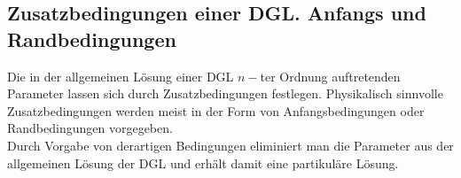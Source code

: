 \begin{enumerate}
\begin{figure}[ht]
\begin{minipage}[b]{0.45\linewidth}
\begin{center}
\end{center}

\end{minipage}
\end{figure}
\end{enumerate}
\subsection*{Zusatzbedingungen einer DGL. Anfangs und Randbedingungen}
Die in der allgemeinen Lösung einer DGL $n-$ter Ordnung auftretenden Parameter lassen sich durch Zusatzbedingungen festlegen. Physikalisch sinnvolle Zusatzbedingungen werden meist in der Form von Anfangsbedingungen oder Randbedingungen vorgegeben. \\

Durch Vorgabe von derartigen Bedingungen eliminiert man die Parameter aus der allgemeinen Lösung der DGL und erhält damit eine partikuläre Lösung.

